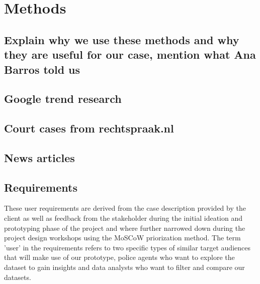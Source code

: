 \section{Methods}
\subsection{Explain why we use these methods and why they are useful for our case, mention what Ana Barros told us}
\subsection{Google trend research}
\subsection{Court cases from rechtspraak.nl}
\subsection{News articles}

\subsection{Requirements}



These user requirements are derived from the case description provided by the client as well as feedback from the stakeholder during the initial ideation and prototyping phase of the project and where further narrowed down during the project design workshops using the MoSCoW priorization method. The term 'user' in the requirements refers to two specific types of similar target audiences that will make use of our prototype, police agents who want to explore the dataset to gain insights and data analysts who want to filter and compare our datasets.

